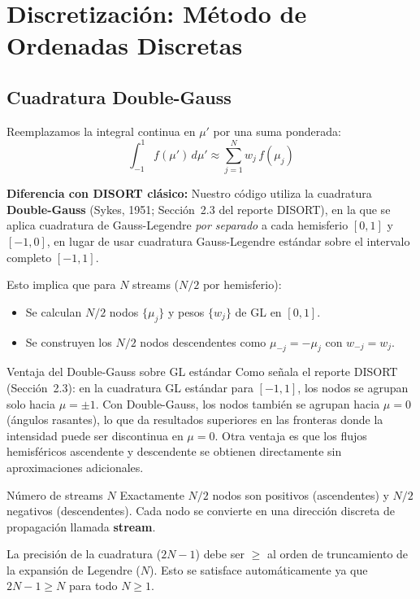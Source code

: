 \documentclass[a4paper,11pt]{article}
\begin{document}
\section{Discretizaci\'on: M\'etodo de Ordenadas Discretas}

\subsection{Cuadratura Double-Gauss}

Reemplazamos la integral continua en $\mu'$ por una suma ponderada:
\begin{equation}
    \int_{-1}^{1}f(\mu')\,d\mu' \approx \sum_{j=1}^{N}w_j\,f(\mu_j)
\end{equation}

\textbf{Diferencia con DISORT cl\'asico:} Nuestro c\'odigo utiliza la cuadratura
\textbf{Double-Gauss} (Sykes, 1951; Secci\'on~2.3 del reporte DISORT), en la que
se aplica cuadratura de Gauss-Legendre \emph{por separado} a cada hemisferio
$[0,1]$ y $[-1,0]$, en lugar de usar cuadratura Gauss-Legendre est\'andar sobre
el intervalo completo $[-1,1]$.

Esto implica que para $N$ streams ($N/2$ por hemisferio):
\begin{itemize}
    \item Se calculan $N/2$ nodos $\{\mu_j\}$ y pesos $\{w_j\}$ de GL en $[0,1]$.
    \item Se construyen los $N/2$ nodos descendentes como $\mu_{-j} = -\mu_j$
          con $w_{-j} = w_j$.
\end{itemize}

\begin{concept}{Ventaja del Double-Gauss sobre GL est\'andar}
Como se\~nala el reporte DISORT (Secci\'on~2.3): en la cuadratura GL est\'andar
para $[-1,1]$, los nodos se agrupan solo hacia $\mu = \pm 1$.  Con Double-Gauss,
los nodos tambi\'en se agrupan hacia $\mu = 0$ (\'angulos rasantes), lo que da
resultados superiores en las fronteras donde la intensidad puede ser discontinua
en $\mu = 0$.  Otra ventaja es que los flujos hemisf\'ericos ascendente y
descendente se obtienen directamente sin aproximaciones adicionales.
\end{concept}

\begin{concept}{N\'umero de streams $N$}
Exactamente $N/2$ nodos son positivos (ascendentes) y $N/2$ negativos
(descendentes).  Cada nodo se convierte en una direcci\'on discreta de
propagaci\'on llamada \textbf{stream}.

La precisi\'on de la cuadratura ($2N-1$) debe ser $\geq$ al orden de
truncamiento de la expansi\'on de Legendre ($N$).  Esto se satisface
autom\'aticamente ya que $2N-1 \geq N$ para todo $N \geq 1$.
\end{concept}
\end{document}
